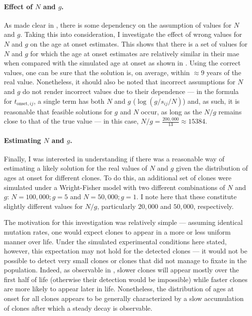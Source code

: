 \paragraph{Effect of $N$ and $g$.} As made clear in , there is some dependency on the assumption of values for $N$ and $g$. Taking this into consideration, I investigate the effect of wrong values for $N$ and $g$ on the age at onset estimates. This shows that there is a set of values for $N$ and $g$ for which the age at onset estimates are relatively similar in their \ac{mae} when compared with the simulated age at onset as shown in . Using the correct values, one can be sure that the solution is, on average, within $\approx 9$ years of the real value. Nonetheless, it should also be noted that incorrect assumptions for $N$ and $g$ do not render incorrect values due to their dependence --- in the formula for $t_{\mathrm{onset},ij}$, a single term has both $N$ and $g$ ($\log(g/s_{ij}/N)$) and, as such, it is reasonable that feasible solutions for $g$ and $N$ occur, as long as the $N/g$ remains close to that of the true value --- in this case, $N/g = \frac{200,000}{13} \approx 15384$.

\begin{figure}[!ht]
	\label{fig:age-at-onset-mae}
\end{figure}

\paragraph{Estimating $N$ and $g$.} Finally, I was interested in understanding if there was a reasonable way of estimating a likely solution for the real values of $N$ and $g$ given the distribution of ages at onset for different clones. To do this, an additional set of clones were simulated under a Wright-Fisher model with two different combinations of $N$ and $g$: $N=100,000;g=5$ and $N=50,000;g=1$. I note here that these constitute slightly different values for $N/g$, particularly $20,000$ and $50,000$, respectively. 

The motivation for this investigation was relatively simple --- assuming identical mutation rates, one would expect clones to appear in a more or less uniform manner over life. Under the simulated experimental conditions here stated, however, this expectation may not hold for the detected clones --- it would not be possible to detect very small clones or clones that did not manage to fixate in the population. Indeed, as observable in , slower clones will appear mostly over the first half of life (otherwise their detection would be impossible) while faster clones are more likely to appear later in life. Nonetheless, the distribution of ages at onset for all clones appears to be generally characterized by a slow accumulation of clones after which a steady decay is observable.

